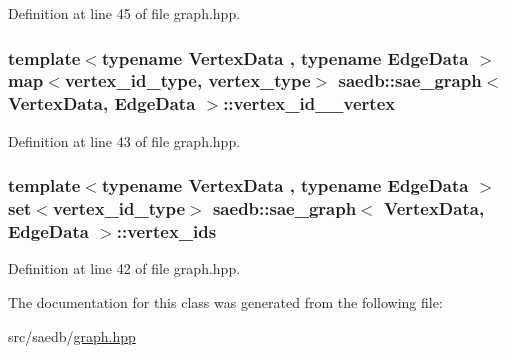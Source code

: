Definition at line 45 of file graph.\-hpp.

\hypertarget{classsaedb_1_1sae__graph_a48eea89cb33990272507f967d5116216}{
\subsubsection[{vertex\-\_\-id\-\_\-2\-\_\-vertex}]{\setlength{\rightskip}{0pt plus 5cm}template$<$typename Vertex\-Data , typename Edge\-Data $>$ map$<${\bf vertex\-\_\-id\-\_\-type}, {\bf vertex\-\_\-type}$>$ {\bf saedb\-::sae\-\_\-graph}$<$ Vertex\-Data, Edge\-Data $>$\-::vertex\-\_\-id\-\_\-\_\-vertex}}\label{d6/d2b/classsaedb_1_1sae__graph_a48eea89cb33990272507f967d5116216}


Definition at line 43 of file graph.\-hpp.

\hypertarget{classsaedb_1_1sae__graph_a2ccc2ab5b2a101c3a1c323d24ebc8575}{
\subsubsection[{vertex\-\_\-ids}]{\setlength{\rightskip}{0pt plus 5cm}template$<$typename Vertex\-Data , typename Edge\-Data $>$ set$<${\bf vertex\-\_\-id\-\_\-type}$>$ {\bf saedb\-::sae\-\_\-graph}$<$ Vertex\-Data, Edge\-Data $>$\-::vertex\-\_\-ids}}\label{d6/d2b/classsaedb_1_1sae__graph_a2ccc2ab5b2a101c3a1c323d24ebc8575}


Definition at line 42 of file graph.\-hpp.



The documentation for this class was generated from the following file\-:\begin{DoxyCompactItemize}
\item 
src/saedb/\hyperlink{graph_8hpp}{graph.\-hpp}\end{DoxyCompactItemize}
